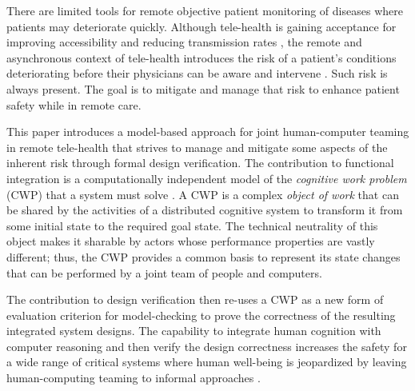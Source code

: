 There are limited tools for remote objective patient monitoring of diseases where patients may deteriorate quickly. Although tele-health is gaining acceptance for improving accessibility and reducing transmission rates \cite{10.1093/jamia/ocaa048,telehealth,10.1093/jamia/ocaa067}, the remote and asynchronous context of tele-health introduces the risk of a patient's conditions deteriorating before their physicians can be aware and intervene \cite{10.1097/ALN.0000000000003578}. Such risk is always present. The goal is to mitigate and manage that risk to enhance patient safety while in remote care. 

\begin{comment}
  Remote patient monitoring relies on clinicians, health IT, patients-caregivers, and other concurrent actors to each reliably perform various asynchronous tasks to coordinate patient care and safety \cite{remote,Aalam229}. Designing such systems becomes complex quickly because actors are outside the direct control of the system. These distributed and asynchronous characteristics make manual reasoning about functional integration and safety early in the design process very difficult; and yet, early in the design process is exactly the time to clearly establish the utility of the design in fulfilling its intended purpose. 
\end{comment}

This paper introduces a model-based approach for joint human-computer teaming in remote tele-health 
that strives to manage and mitigate some aspects of the inherent risk through formal design verification. The contribution to functional integration is a computationally independent model of the \emph{cognitive work problem} (CWP) that a system must solve \cite{workflowmodel,workcentered,BERRY201615,chi2010}.  A CWP is a complex \emph{object of work} that can be shared by the activities of a distributed cognitive system to transform it from some initial state to the required goal state. The technical neutrality of this object makes it sharable by actors whose performance properties are vastly different; thus, the CWP provides a common basis to represent its state changes that can be performed by a joint team of people and computers. 

The contribution to design verification then re-uses a CWP as a new form of evaluation criterion for model-checking to prove the correctness of the resulting integrated system designs. The capability to integrate human cognition with computer reasoning and then verify the design correctness increases the safety for a wide range of critical systems where human well-being is jeopardized by leaving human-computing teaming to informal approaches \cite{remote,Aalam229}.

